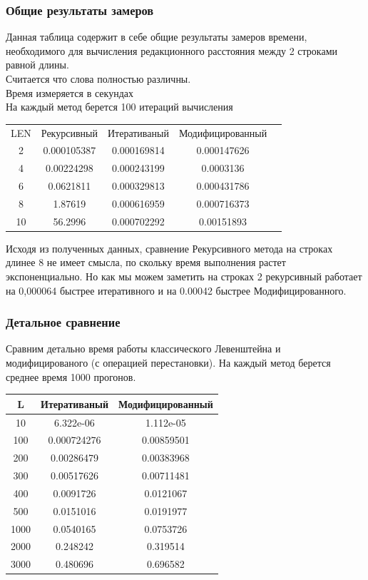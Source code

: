 \documentclass[a4paper, 14pt]{article}
\begin{document}
	\subsubsection{Общие результаты замеров}
	
	Данная таблица содержит в себе общие результаты замеров времени, необходимого для вычисления
	редакционного расстояния между 2 строками равной длины. \\
	Считается что слова полностью различны. \\
	Время измеряется в секундах \\
	На каждый метод берется 100 итераций вычисления \\
	
	\begin{tabular}{|c | c | c | c | c |}
		\hline 
		LEN	& Рекурсивный & Итеративаный & Модифицированный \\
		2 & 0.000105387 & 0.000169814 & 0.000147626 \\
		4 & 0.00224298 & 0.000243199 & 0.0003136 \\
		6 & 0.0621811 & 0.000329813 & 0.000431786 \\
		8 & 1.87619 & 0.000616959 & 0.000716373 \\
		10 & 56.2996 & 0.000702292 & 0.00151893 \\
		\hline
	\end{tabular}
	
	Исходя из полученных данных, сравнение Рекурсивного метода на строках длинее 8 не имеет смысла, по скольку время выполнения растет экспоненциально. Но как мы можем заметить на строках 2 рекурсивный работает на 0,000064 быстрее итеративного и на 0.00042 быстрее Модифицированного.
	
	\subsubsection{Детальное сравнение}
	
	Сравним детально время работы классического Левенштейна и модифицированого (с операцией перестановки). На каждый метод берется среднее время 1000 прогонов. \\
	
	\begin{tabular}{|c | c | c |}
		L & Итеративаный & Модифицированный \\
		\hline
		10 & 6.322e-06 & 1.112e-05 \\
		100 & 0.000724276 & 0.00859501 \\
		200 & 0.00286479 & 0.00383968 \\
		300 & 0.00517626 & 0.00711481 \\
		400 & 0.0091726 & 0.0121067 \\
		500 & 0.0151016 & 0.0191977 \\
		1000 & 0.0540165 & 0.0753726 \\
		2000 & 0.248242 & 0.319514 \\
		3000 & 0.480696 & 0.696582 \\
		\hline
	\end{tabular}
	
\end{document}
